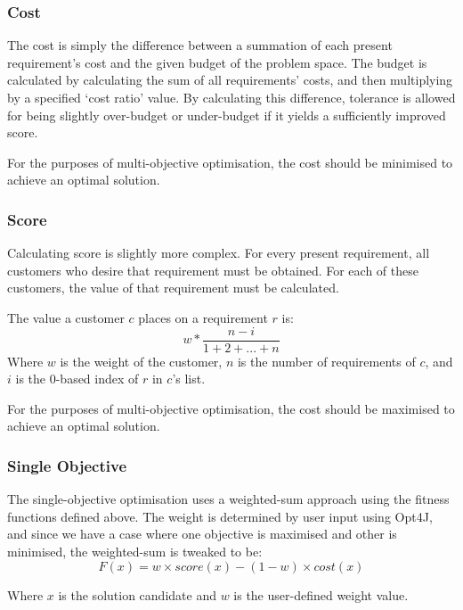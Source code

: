 \documentclass[10pt, a4paper]{article}
\begin{document}
\subsubsection{Cost} %
\label{ssub:cost}
The cost is simply the difference between a summation of each present
requirement's cost and the given budget of the problem space. The budget is
calculated by calculating the sum of all requirements' costs, and then
multiplying by a specified `cost ratio' value. By calculating this difference,
tolerance is allowed for being slightly over-budget or under-budget if it yields
a sufficiently improved score.

For the purposes of multi-objective optimisation, the cost should be minimised
to achieve an optimal solution.

\subsubsection{Score} %
\label{ssub:score}
Calculating score is slightly more complex. For every present requirement, all
customers who desire that requirement must be obtained. For each of these
customers, the value of that requirement must be calculated.

The value a customer \(c\) places on a requirement \(r\) is:
\[w * \frac{n - i}{1 + 2 + ... + n}\]
Where \(w\) is the weight of the customer, \(n\) is the number of requirements
of \(c\), and \(i\) is the 0-based index of \(r\) in \(c\)'s list.

For the purposes of multi-objective optimisation, the cost should be maximised
to achieve an optimal solution.

\subsubsection{Single Objective} %
\label{ssub:single_objective}
The single-objective optimisation uses a weighted-sum approach using the fitness
functions defined above. The weight is determined by user input using Opt4J, and
since we have a case where one objective is maximised and other is minimised,
the weighted-sum is tweaked to be:
\[F(x) = w \times score(x) - (1 - w) \times cost(x)\]

Where \(x\) is the solution candidate and \(w\) is the user-defined weight
value.
\end{document}

